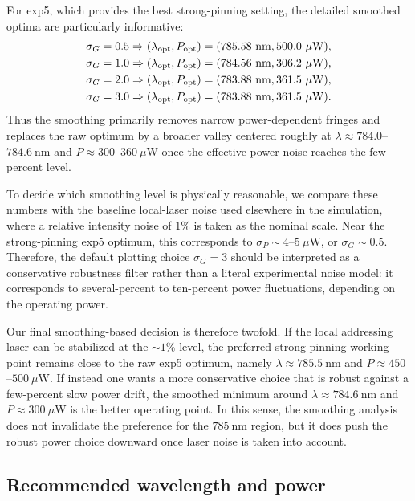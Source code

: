 \documentclass[aps,%
onecolumn,%
floatfix,%
pra,%
amsfonts,%
longbibliography,%
groupedaddress,%
superscriptaddress]{revtex4-2}%
\newcommand{\1}{\mathbbm{1}}
\begin{document}
For exp5, which provides the best strong-pinning setting, the detailed
smoothed optima are particularly informative:
\begin{align*}
    \sigma_G = 0.5 &\Rightarrow (\lambda_{\rm opt},P_{\rm opt})
    = (785.58~\mathrm{nm},500.0~\mu\mathrm{W}),\\
    \sigma_G = 1.0 &\Rightarrow (\lambda_{\rm opt},P_{\rm opt})
    = (784.56~\mathrm{nm},306.2~\mu\mathrm{W}),\\
    \sigma_G = 2.0 &\Rightarrow (\lambda_{\rm opt},P_{\rm opt})
    = (783.88~\mathrm{nm},361.5~\mu\mathrm{W}),\\
    \sigma_G = 3.0 &\Rightarrow (\lambda_{\rm opt},P_{\rm opt})
    = (783.88~\mathrm{nm},361.5~\mu\mathrm{W}).
\end{align*}
Thus the smoothing primarily removes narrow power-dependent fringes and
replaces the raw optimum by a broader valley centered roughly at
$\lambda \approx 784.0$--$784.6~\mathrm{nm}$ and
$P \approx 300$--$360~\mu\mathrm{W}$ once the effective power noise reaches the
few-percent level.

To decide which smoothing level is physically reasonable, we compare these
numbers with the baseline local-laser noise used elsewhere in the simulation,
where a relative intensity noise of $1\%$ is taken as the nominal scale. Near
the strong-pinning exp5 optimum, this corresponds to
$\sigma_P \sim 4$--$5~\mu\mathrm{W}$, or $\sigma_G \sim 0.5$. Therefore,
the default plotting choice $\sigma_G=3$ should be interpreted as a
conservative robustness filter rather than a literal experimental noise model:
it corresponds to several-percent to ten-percent power fluctuations, depending
on the operating power.

Our final smoothing-based decision is therefore twofold. If the local
addressing laser can be stabilized at the $\sim 1\%$ level, the preferred
strong-pinning working point remains close to the raw exp5 optimum, namely
$\lambda \approx 785.5~\mathrm{nm}$ and
$P \approx 450$--$500~\mu\mathrm{W}$. If instead one wants a more conservative
choice that is robust against a few-percent slow power drift, the smoothed
minimum around $\lambda \approx 784.6~\mathrm{nm}$ and
$P \approx 300~\mu\mathrm{W}$ is the better operating point. In this sense,
the smoothing analysis does not invalidate the preference for the
$785~\mathrm{nm}$ region, but it does push the robust power choice downward
once laser noise is taken into account.

\subsection{Recommended wavelength and power}
\end{document}
